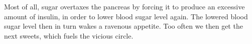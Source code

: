 \documentclass[../main.tex]{subfiles}
\begin{document}
Most of all, sugar overtaxes the pancreas by forcing it to produce an excessive amount of insulin, in order to lower blood sugar level again.
The lowered blood sugar level then in turn wakes a ravenous appetite.
Too often we then get the next sweets, which fuels the vicious circle.
\end{document}
